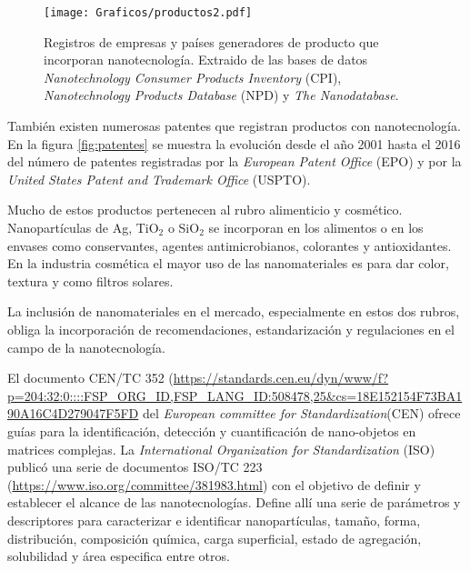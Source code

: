 		\begin{figure}[ht!]
 			\begin{center}
 			\texttt{[image: Graficos/productos2.pdf]}
 			\caption[Cantidad de productos, compañías y origen con base nanotecnologica]{Registros de empresas y países generadores de producto que incorporan nanotecnología. Extraido de las bases de datos \textit{Nanotechnology Consumer Products Inventory} (CPI), \textit{Nanotechnology Products Database} (NPD) y \textit{The Nanodatabase}.}
 			\label{fig:productos}
 		    \end{center}
 		    \end{figure}

 	 También existen numerosas patentes que registran productos con nanotecnología. En la figura \ref{fig:patentes} se muestra la evolución desde el año 2001 hasta el 2016 del número de patentes registradas por la \textit{European Patent Office} (EPO) y por la \textit{United States Patent and Trademark Office} (USPTO).

     Mucho de estos productos pertenecen al rubro alimenticio y cosmético. Nanopartículas de Ag, TiO$_2$ o SiO$_2$ se incorporan en los alimentos o en los envases como conservantes, agentes antimicrobianos, colorantes y antioxidantes. En la industria cosmética el mayor uso de las nanomateriales es para dar color, textura y como filtros solares.
 	
 	 La inclusión de nanomateriales en el mercado, especialmente en estos dos rubros, obliga la incorporación de recomendaciones, estandarización y regulaciones en el campo de la nanotecnología.  

 	 El\hspace{1pt} documento\hspace{1pt} CEN/TC\hspace{1pt} 352 (\url{https://standards.cen.eu/dyn/www/f?p=204:32:0::::FSP_ORG_ID,FSP_LANG_ID:508478,25&cs=18E152154F73BA190A16C4D279047F5FD}
 	 del \textit{European committee for Standardization}(CEN) ofrece guías para la identificación, detección y cuantificación de nano-objetos en matrices complejas. La \textit{International Organization for Standardization} (ISO) publicó una serie de documentos ISO/TC 223 (\url{https://www.iso.org/committee/381983.html}) con el objetivo de definir y establecer el alcance de las nanotecnologías. Define allí una serie de parámetros y descriptores para caracterizar e identificar nanopartículas, tamaño, forma, distribución, composición química, carga superficial, estado de agregación, solubilidad y área especifica entre otros.

